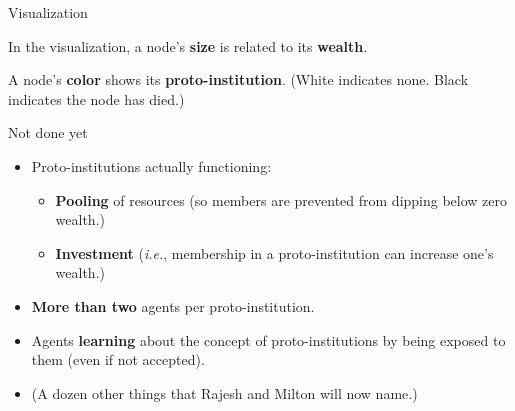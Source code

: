 \documentclass[12pt]{beamer}
\begin{document}
\begin{frame}[c]{Visualization}

In the visualization, a node's \textbf{size} is related to its \textbf{wealth}.

\pause
\bigskip

A node's \textbf{color} shows its \textbf{proto-institution}. (White indicates
none. Black indicates the node has died.)

\end{frame}

\begin{frame}[c]{Not done yet}

\pause
\begin{itemize}
\itemsep.1em
\item Proto-institutions actually functioning:
    \begin{itemize}
    \item \textbf{Pooling} of resources (so members are prevented from dipping
below zero wealth.)
\pause
    \item \textbf{Investment} (\textit{i.e.}, membership in a proto-institution
can increase one's wealth.)
    \end{itemize}
\pause
\item \textbf{More than two} agents per proto-institution.
\pause
\item Agents \textbf{learning} about the concept of proto-institutions by being
exposed to them (even if not accepted).
\pause
\item (A dozen other things that Rajesh and Milton will now name.)
\end{itemize}

\end{frame}
\end{document}
